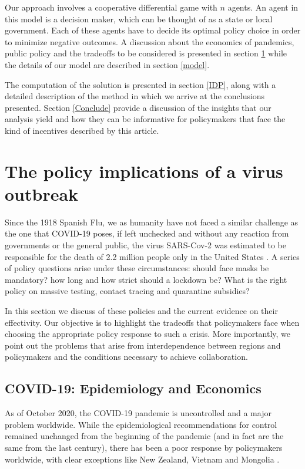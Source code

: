 \documentclass[11pt, oneside]{article}
\begin{document}
Our approach involves a cooperative differential game with $n$ agents. An agent in this model is a decision maker, which can be thought of as a state or local government. Each of these agents have to decide its optimal policy choice in order to minimize negative outcomes. A discussion about the economics of pandemics, public policy and the tradeoffs to be considered is presented in section \ref{Policy} while the details of our model are described in section \ref{model}.

The computation of the solution is presented in section \ref{IDP}, along with a detailed description of the method in which we arrive at the conclusions presented. Section \ref{Conclude} provide a discussion of the insights that our analysis yield and how they can be informative for policymakers that face the kind of incentives described by this article.


\section{The policy implications of a virus outbreak}\label{Policy}
Since the 1918 Spanish Flu, we as humanity have not faced a similar challenge as the one that COVID-19 poses, if left unchecked and without any reaction from governments or the general public, the virus SARS-Cov-2 was estimated to be responsible for the death of 2.2 million people only in the United States \cite{Walker2020}. A series of policy questions arise under these circumstances: should face masks be mandatory? how long and how strict should a lockdown be? What is the right policy on massive testing, contact tracing and quarantine subsidies?

In this section we discuss of these policies and the current evidence on their effectivity. Our objective is to highlight the tradeoffs that policymakers face when choosing the appropriate policy response to such a crisis. More importantly, we point out the problems that arise from interdependence between regions and policymakers and the conditions necessary to achieve collaboration.

\subsection{COVID-19: Epidemiology and Economics}

As of October 2020, the COVID-19 pandemic is uncontrolled and a major problem worldwide. While the epidemiological recommendations for control remained unchanged from the beginning of the pandemic (and in fact are the same from the last century), there has been a poor response by policymakers worldwide, with clear exceptions like New Zealand, Vietnam and Mongolia \cite{epiellie}.
\end{document}
